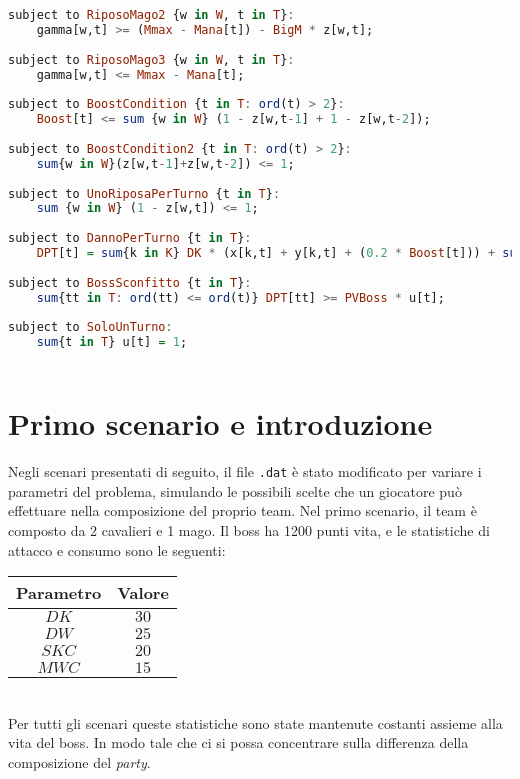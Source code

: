 \documentclass[12pt]{article}
\begin{document}
\begin{lstlisting}[language=haskell, frame=single, caption={Modello in Ampl}, captionpos=b, keywordstyle=\color{purple}]
subject to RiposoMago2 {w in W, t in T}:
    gamma[w,t] >= (Mmax - Mana[t]) - BigM * z[w,t];
    
subject to RiposoMago3 {w in W, t in T}:
    gamma[w,t] <= Mmax - Mana[t];
    
subject to BoostCondition {t in T: ord(t) > 2}:
    Boost[t] <= sum {w in W} (1 - z[w,t-1] + 1 - z[w,t-2]);
        
subject to BoostCondition2 {t in T: ord(t) > 2}:
    sum{w in W}(z[w,t-1]+z[w,t-2]) <= 1;
    
subject to UnoRiposaPerTurno {t in T}:
    sum {w in W} (1 - z[w,t]) <= 1;
    
subject to DannoPerTurno {t in T}:
    DPT[t] = sum{k in K} DK * (x[k,t] + y[k,t] + (0.2 * Boost[t])) + sum{w in W} z[w,t] * DW;
    
subject to BossSconfitto {t in T}:
    sum{tt in T: ord(tt) <= ord(t)} DPT[tt] >= PVBoss * u[t];
    
subject to SoloUnTurno:
    sum{t in T} u[t] = 1; 
    
\end{lstlisting}

\section{Primo scenario e introduzione}
Negli scenari presentati di seguito, il file \texttt{.dat} è stato modificato per variare i parametri del problema, simulando le possibili scelte che un giocatore può effettuare nella composizione del proprio team. 
Nel primo scenario, il team è composto da 2 cavalieri e 1 mago. Il boss ha 1200 punti vita, e le statistiche di attacco e consumo sono le seguenti:
\begin{table}[h!]
    \centering
    \begin{tabular}{|c|c|}
        \hline
        \textbf{Parametro} & \textbf{Valore} \\
        \hline
        $DK$ & $30$ \\
        $DW$ & $25$ \\
        $SKC$ & $20$ \\
        $MWC$ & $15$ \\
        \hline
    \end{tabular}
\end{table}\\
Per tutti gli scenari queste statistiche sono state mantenute costanti assieme alla vita del boss. In modo tale che ci si possa concentrare sulla differenza della composizione del \textit{party}.
\end{document}
